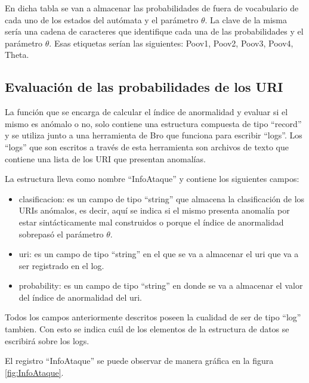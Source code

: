 En dicha tabla se van a almacenar las probabilidades de fuera de vocabulario de cada uno de los estados del autómata y el parámetro $\theta$. La clave de la misma sería una cadena de caracteres que identifique cada una de las probabilidades  y el parámetro  $\theta$. Esas etiquetas serían las siguientes: Poov1, Poov2, Poov3, Poov4, Theta.  

\subsection*{Evaluación de las probabilidades de los URI}
\label{sssec:estructuraEvaluacion}

La función  que se encarga de calcular el índice de anormalidad  y evaluar si el mismo es anómalo o no, solo contiene una estructura compuesta de tipo ``record'' y se utiliza junto a una herramienta de Bro que funciona para escribir ``logs''. Los ``logs'' que son escritos a través de esta herramienta son archivos de texto que contiene una lista de los URI que presentan anomalías.

La estructura lleva como nombre ``InfoAtaque'' y contiene los siguientes campos:

\begin{itemize}
\item clasificacion: es un campo de tipo ``string'' que almacena la clasificación de los URIs anómalos, es decir, aquí se indica si el mismo presenta anomalía por estar sintácticamente mal construidos o porque el índice de anormalidad sobrepasó el parámetro $\theta$.
\item uri: es un campo de tipo ``string'' en el que se va a almacenar el uri que va a ser registrado en el log.
\item probability: es un campo de tipo ``string'' en donde se va a almacenar el valor del índice de anormalidad del uri.
\end{itemize}

Todos los campos anteriormente descritos poseen la cualidad de ser de tipo ``log'' tambien. Con esto se indica cuál de los elementos de la estructura de datos se escribirá sobre los logs.

    El registro ``InfoAtaque'' se puede observar de manera gráfica en la figura \ref{fig:InfoAtaque}. 
    
